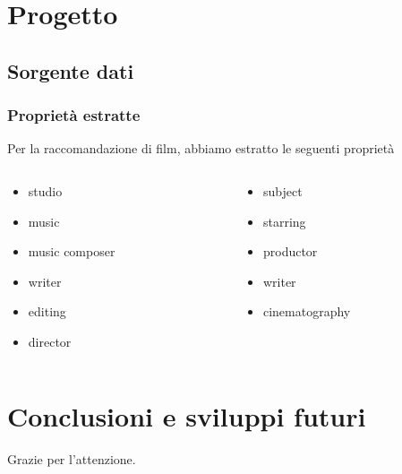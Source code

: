 \documentclass{beamer}
\begin{document}

\section{Progetto}

\subsection{Sorgente dati}


\begin{frame}
\frametitle{Proprietà estratte}
Per la raccomandazione di film, abbiamo estratto le seguenti proprietà
\begin{columns}
\begin{column}{0.5\textwidth}
\begin{itemize}
\item studio
\item music
\item music composer
\item writer
\item editing
\item director
\end{itemize}
\end{column}
\begin{column}{0.5\textwidth}
\begin{itemize}
\item subject
\item starring
\item productor
\item writer
\item cinematography
\end{itemize}
\end{column}
\end{columns}
\end{frame}


\section{Conclusioni e sviluppi futuri}

\begin{frame}
\begin{center}
Grazie per l'attenzione.
\end{center}
\end{frame}
\end{document}
